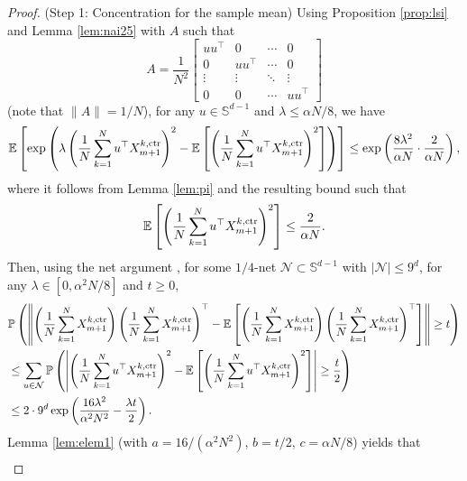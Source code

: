 \documentclass[12pt,reqno]{amsart}
\theoremstyle{remark}
\theoremstyle{definition}
\newcommand{\bbS}{\mathbb{S}}
\newcommand{\calN}{\mathcal{N}}
\newcommand{\E}{\mathbb{E}}
\renewcommand{\Pr}{\mathbb{P}}
\newcommand{\ctr}{\textnormal{ctr}}
\begin{document}
\begin{proof}
    (Step 1: Concentration for the sample mean)
    Using Proposition \ref{prop:lsi} and Lemma \ref{lem:nai25} with $A$ such that 
    \begin{equation*}
        A = \frac{1}{N^{2}}\left[\begin{matrix}
            uu^{\top} & 0 & \cdots & 0\\
            0 & uu^{\top} & \cdots & 0\\
            \vdots & \vdots & \ddots & \vdots\\
            0 & 0 & \cdots & uu^{\top}
        \end{matrix}\right]
    \end{equation*}
    (note that $\|A\|=1/N$), for any $u\in\bbS^{d-1}$ and $\lambda\le \alpha N/8$, we have
    \begin{equation*}
        \E\left[\exp\left(\lambda\left(\frac{1}{N}\sum_{k=1}^{N}u^{\top}X_{m+1}^{k,\ctr}\right)^{2}-\E\left[\left(\frac{1}{N}\sum_{k=1}^{N}u^{\top}X_{m+1}^{k,\ctr}\right)^{2}\right]\right)\right]\le \exp\left(\frac{8\lambda^{2}}{\alpha N}\cdot\frac{2}{\alpha N}\right),
    \end{equation*}
    where it follows from Lemma \ref{lem:pi} and the resulting bound such that
    \begin{equation*}
        \E\left[\left(\frac{1}{N}\sum_{k=1}^{N}u^{\top}X_{m+1}^{k,\ctr}\right)^{2}\right]\le \frac{2}{\alpha N}.
    \end{equation*}
    Then, using the net argument \citep{vershynin2018high}, for some $1/4$-net $\calN\subset\bbS^{d-1}$ with $|\calN|\le 9^{d}$, for any $\lambda\in[0,\alpha^{2}N/8]$ and $t\ge0$,
    \begin{align*}
        &\Pr\left(\left\|\left(\frac{1}{N}\sum_{k=1}^{N}X_{m+1}^{k,\ctr}\right)\left(\frac{1}{N}\sum_{k=1}^{N}X_{m+1}^{k,\ctr}\right)^{\top}-\E\left[\left(\frac{1}{N}\sum_{k=1}^{N}X_{m+1}^{k,\ctr}\right)\left(\frac{1}{N}\sum_{k=1}^{N}X_{m+1}^{k,\ctr}\right)^{\top}\right]\right\|\ge t\right)\\
        &\le \sum_{u\in\calN}\Pr\left(\left|\left(\frac{1}{N}\sum_{k=1}^{N}u^{\top}X_{m+1}^{k,\ctr}\right)^{2}-\E\left[\left(\frac{1}{N}\sum_{k=1}^{N}u^{\top}X_{m+1}^{k,\ctr}\right)^{2}\right]\right|\ge \frac{t}{2}\right)\\
        &\le 2\cdot 9^{d}\exp\left(\frac{16\lambda^{2}}{\alpha^{2} N^{2}}-\frac{\lambda t}{2}\right).
    \end{align*}
    Lemma \ref{lem:elem1} (with $a=16/(\alpha^{2}N^{2})$, $b=t/2$, $c=\alpha N/8$) yields that
    \begin{align*}

\end{align*}
\end{proof}
\end{document}
